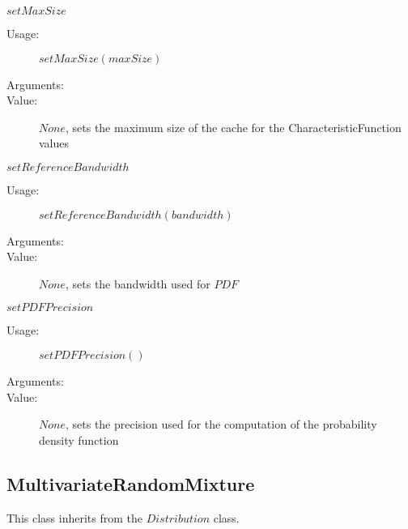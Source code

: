 \begin{description}
\begin{description}
  \item $setMaxSize$
    \begin{description}
    \item[Usage:]  $setMaxSize(maxSize)$
    \item[Arguments:]  \strut
    \item[Value:] $None$, sets the maximum size of the cache for the CharacteristicFunction values
    \end{description}

  \item $setReferenceBandwidth$
    \begin{description}
    \item[Usage:]  $setReferenceBandwidth(bandwidth)$
    \item[Arguments:] \strut
    \item[Value:] $None$, sets the bandwidth used for $PDF$
    \end{description}

  \item $setPDFPrecision$
    \begin{description}
    \item[Usage:]  $setPDFPrecision()$
    \item[Arguments:]  \strut
    \item[Value:] $None$, sets the precision used for the computation of the probability density function
    \end{description}

  \end{description}

\end{description}

\subsection{MultivariateRandomMixture}
This class inherits from the $Distribution$ class.

